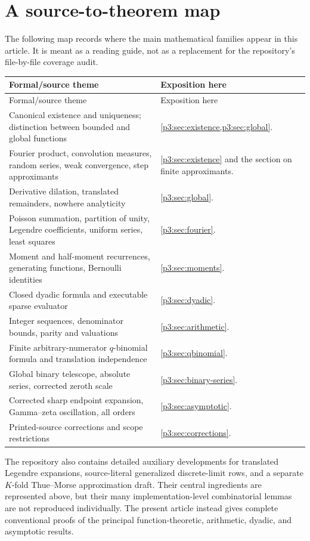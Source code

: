 \documentclass[11pt]{article}
\numberwithin{equation}{section}
\theoremstyle{definition}
\theoremstyle{remark}
\begin{document}
\section{A source-to-theorem map}\label{p3:app:source-map}

The following map records where the main mathematical families appear in this
article.  It is meant as a reading guide, not as a replacement for the
repository's file-by-file coverage audit.

\begin{longtable}{p{}p{}}
\toprule
Formal/source theme & Exposition here\\
\midrule
\endfirsthead
\toprule
Formal/source theme & Exposition here\\
\midrule
\endhead
Canonical existence and uniqueness; distinction between bounded and global
functions & \cref{p3:sec:existence,p3:sec:global}.\\
Fourier product, convolution measures, random series, weak convergence, step
approximants & \cref{p3:sec:existence} and the section on finite approximants.\\
Derivative dilation, translated remainders, nowhere analyticity &
\cref{p3:sec:global}.\\
Poisson summation, partition of unity, Legendre coefficients, uniform series,
least squares & \cref{p3:sec:fourier}.\\
Moment and half-moment recurrences, generating functions, Bernoulli identities
& \cref{p3:sec:moments}.\\
Closed dyadic formula and executable sparse evaluator & \cref{p3:sec:dyadic}.\\
Integer sequences, denominator bounds, parity and valuations &
\cref{p3:sec:arithmetic}.\\
Finite arbitrary-numerator $q$-binomial formula and translation independence &
\cref{p3:sec:qbinomial}.\\
Global binary telescope, absolute series, corrected zeroth scale &
\cref{p3:sec:binary-series}.\\
Corrected sharp endpoint expansion, Gamma--zeta oscillation, all orders &
\cref{p3:sec:asymptotic}.\\
Printed-source corrections and scope restrictions & \cref{p3:sec:corrections}.\\
\bottomrule
\end{longtable}

The repository also contains detailed auxiliary developments for translated
Legendre expansions, source-literal generalized discrete-limit rows, and a
separate $K$-fold Thue--Morse approximation draft.  Their central ingredients
are represented above, but their many implementation-level combinatorial
lemmas are not reproduced individually.  The present article instead gives
complete conventional proofs of the principal function-theoretic, arithmetic,
dyadic, and asymptotic results.
\end{document}
